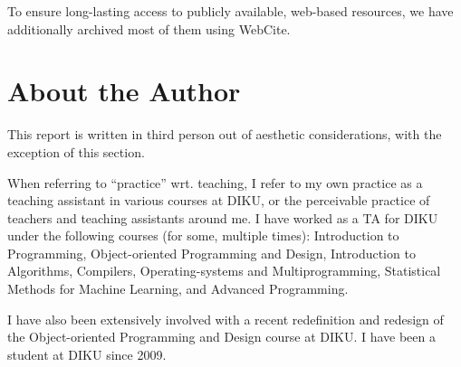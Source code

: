 To ensure long-lasting access to publicly available, web-based resources, we
have additionally archived most of them using
WebCite\textsuperscript{\textregistered}.

\section{About the Author}

This report is written in third person out of aesthetic considerations, with
the exception of this section.

When referring to ``practice'' wrt. teaching, I refer to my own practice as a
teaching assistant in various courses at DIKU, or the perceivable practice of
teachers and teaching assistants around me. I have worked as a TA for DIKU
under the following courses (for some, multiple times): Introduction to
Programming, Object-oriented Programming and Design, Introduction to
Algorithms, Compilers, Operating-systems and Multiprogramming, Statistical
Methods for Machine Learning, and Advanced Programming.

I have also been extensively involved with a recent redefinition and redesign
of the Object-oriented Programming and Design course at DIKU. I have been a
student at DIKU since 2009.
